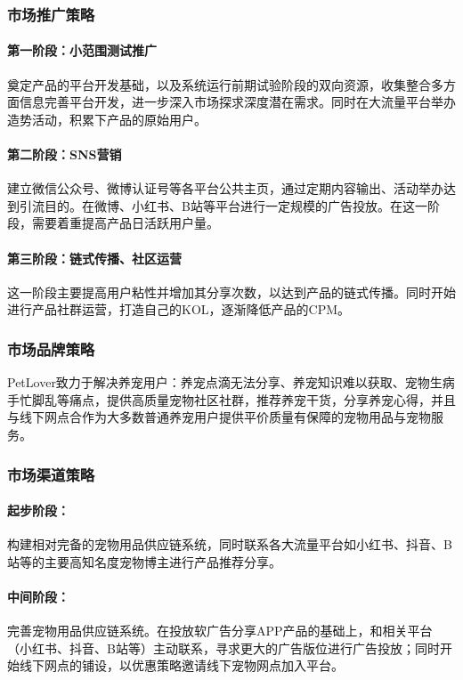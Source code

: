 \documentclass[a4paper]{ctexart}
\begin{document}
\subsubsection{市场推广策略}
\paragraph{第一阶段：小范围测试推广}奠定产品的平台开发基础，以及系统运行前期试验阶段的双向资源，收集整合多方面信息完善平台开发，进一步深入市场探求深度潜在需求。同时在大流量平台举办造势活动，积累下产品的原始用户。
\paragraph{第二阶段：SNS营销}建立微信公众号、微博认证号等各平台公共主页，通过定期内容输出、活动举办达到引流目的。在微博、小红书、B站等平台进行一定规模的广告投放。在这一阶段，需要着重提高产品日活跃用户量。
\paragraph{第三阶段：链式传播、社区运营}这一阶段主要提高用户粘性并增加其分享次数，以达到产品的链式传播。同时开始进行产品社群运营，打造自己的KOL，逐渐降低产品的CPM。

\subsubsection{市场品牌策略}
PetLover致力于解决养宠用户：养宠点滴无法分享、养宠知识难以获取、宠物生病手忙脚乱等痛点，提供高质量宠物社区社群，推荐养宠干货，分享养宠心得，并且与线下网点合作为大多数普通养宠用户提供平价质量有保障的宠物用品与宠物服务。

\subsubsection{市场渠道策略}
\paragraph{起步阶段：}构建相对完备的宠物用品供应链系统，同时联系各大流量平台如小红书、抖音、B站等的主要高知名度宠物博主进行产品推荐分享。
\paragraph{中间阶段：}完善宠物用品供应链系统。在投放软广告分享APP产品的基础上，和相关平台（小红书、抖音、B站等）主动联系，寻求更大的广告版位进行广告投放；同时开始线下网点的铺设，以优惠策略邀请线下宠物网点加入平台。
\end{document}
